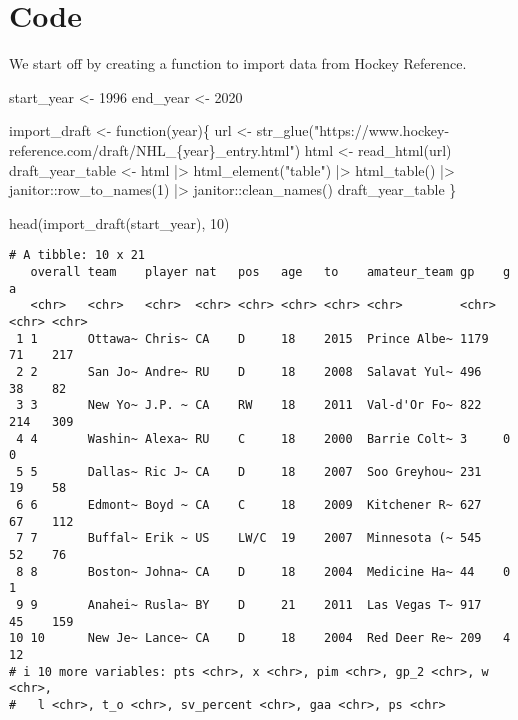 \documentclass[
  letterpaper,
  DIV=11,
  numbers=noendperiod]{scrreprt}
\newenvironment{Shaded}{\begin{snugshade}}{\end{snugshade}}
\newcommand{\ControlFlowTok}[1]{\textcolor[rgb]{0.00,0.23,0.31}{#1}}
\newcommand{\DecValTok}[1]{\textcolor[rgb]{0.68,0.00,0.00}{#1}}
\newcommand{\FunctionTok}[1]{\textcolor[rgb]{0.28,0.35,0.67}{#1}}
\newcommand{\NormalTok}[1]{\textcolor[rgb]{0.00,0.23,0.31}{#1}}
\newcommand{\OtherTok}[1]{\textcolor[rgb]{0.00,0.23,0.31}{#1}}
\newcommand{\SpecialCharTok}[1]{\textcolor[rgb]{0.37,0.37,0.37}{#1}}
\newcommand{\StringTok}[1]{\textcolor[rgb]{0.13,0.47,0.30}{#1}}
\begin{document}
\section{Code}\label{code}

We start off by creating a function to import data from Hockey
Reference.

\begin{Shaded}
\begin{Highlighting}[]
\NormalTok{start\_year }\OtherTok{\textless{}{-}} \DecValTok{1996}
\NormalTok{end\_year }\OtherTok{\textless{}{-}} \DecValTok{2020}

\NormalTok{import\_draft }\OtherTok{\textless{}{-}} \ControlFlowTok{function}\NormalTok{(year)\{}
\NormalTok{  url }\OtherTok{\textless{}{-}} \FunctionTok{str\_glue}\NormalTok{(}\StringTok{"https://www.hockey{-}reference.com/draft/NHL\_\{year\}\_entry.html"}\NormalTok{)}
\NormalTok{  html }\OtherTok{\textless{}{-}} \FunctionTok{read\_html}\NormalTok{(url)}
\NormalTok{  draft\_year\_table }\OtherTok{\textless{}{-}}\NormalTok{ html }\SpecialCharTok{|\textgreater{}} 
    \FunctionTok{html\_element}\NormalTok{(}\StringTok{"table"}\NormalTok{) }\SpecialCharTok{|\textgreater{}} 
    \FunctionTok{html\_table}\NormalTok{() }\SpecialCharTok{|\textgreater{}} 
\NormalTok{    janitor}\SpecialCharTok{::}\FunctionTok{row\_to\_names}\NormalTok{(}\DecValTok{1}\NormalTok{) }\SpecialCharTok{|\textgreater{}} 
\NormalTok{    janitor}\SpecialCharTok{::}\FunctionTok{clean\_names}\NormalTok{()}
\NormalTok{  draft\_year\_table}
\NormalTok{\}}

\FunctionTok{head}\NormalTok{(}\FunctionTok{import\_draft}\NormalTok{(start\_year), }\DecValTok{10}\NormalTok{)}
\end{Highlighting}
\end{Shaded}

\begin{verbatim}
# A tibble: 10 x 21
   overall team    player nat   pos   age   to    amateur_team gp    g     a    
   <chr>   <chr>   <chr>  <chr> <chr> <chr> <chr> <chr>        <chr> <chr> <chr>
 1 1       Ottawa~ Chris~ CA    D     18    2015  Prince Albe~ 1179  71    217  
 2 2       San Jo~ Andre~ RU    D     18    2008  Salavat Yul~ 496   38    82   
 3 3       New Yo~ J.P. ~ CA    RW    18    2011  Val-d'Or Fo~ 822   214   309  
 4 4       Washin~ Alexa~ RU    C     18    2000  Barrie Colt~ 3     0     0    
 5 5       Dallas~ Ric J~ CA    D     18    2007  Soo Greyhou~ 231   19    58   
 6 6       Edmont~ Boyd ~ CA    C     18    2009  Kitchener R~ 627   67    112  
 7 7       Buffal~ Erik ~ US    LW/C  19    2007  Minnesota (~ 545   52    76   
 8 8       Boston~ Johna~ CA    D     18    2004  Medicine Ha~ 44    0     1    
 9 9       Anahei~ Rusla~ BY    D     21    2011  Las Vegas T~ 917   45    159  
10 10      New Je~ Lance~ CA    D     18    2004  Red Deer Re~ 209   4     12   
# i 10 more variables: pts <chr>, x <chr>, pim <chr>, gp_2 <chr>, w <chr>,
#   l <chr>, t_o <chr>, sv_percent <chr>, gaa <chr>, ps <chr>
\end{verbatim}
\end{document}
